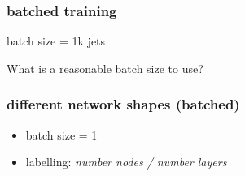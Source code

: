 \documentclass{beamer}
\begin{document}
\begin{frame}
  \frametitle{batched training}
  batch size = 1k jets

    \begin{figure}[htb]
    \centering
    \end{figure}
    What is a reasonable batch size to use?
\end{frame}

\begin{frame}
  \frametitle{different network shapes (batched)}
  \begin{itemize}
  \item batch size = 1
    \item labelling: \textsl{number nodes / number layers}
  \end{itemize}
  
    \begin{figure}[htb]
    \centering
  \end{figure}
\end{frame}
\end{document}
